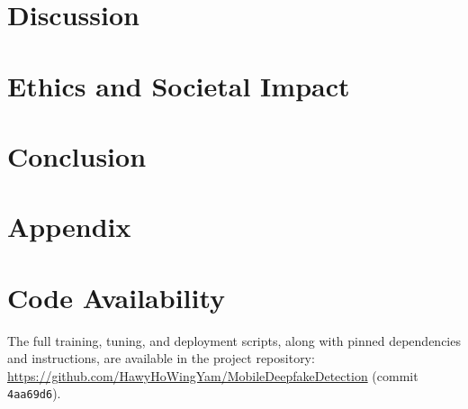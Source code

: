 \documentclass[11pt]{article}
\begin{document}
\section{Discussion}


\section{Ethics and Societal Impact}


\section{Conclusion}


\section*{Appendix}


\section*{Code Availability}
The full training, tuning, and deployment scripts, along with pinned dependencies and instructions, are available in the project repository: \url{https://github.com/HawyHoWingYam/MobileDeepfakeDetection} (commit \texttt{4aa69d6}).


\end{document}
